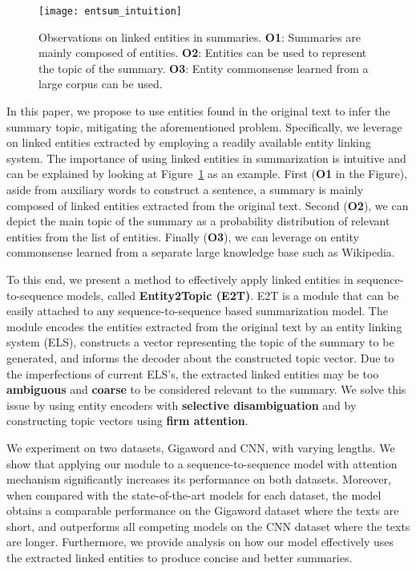 \documentclass[11pt,a4paper]{article}
\begin{document}
\begin{figure}
    \centering
    \texttt{[image: entsum\_intuition]}
    \caption{Observations on linked entities in summaries. \textbf{O1}: Summaries are mainly composed of entities. \textbf{O2}: Entities can be used to represent the topic of the summary. \textbf{O3}: Entity commonsense learned from a large corpus can be used.}
    \label{fig:intuition}
\end{figure}

In this paper, we propose to use entities found in the original text to infer the summary topic, mitigating the aforementioned problem.
Specifically, we leverage on linked entities extracted by employing
a readily available entity linking system.
The importance of using linked entities in summarization is intuitive and can be explained by looking at Figure~\ref{fig:intuition} as an example. First (\textbf{O1} in the Figure), aside from auxiliary words to construct a sentence, a summary is mainly composed of linked entities extracted from the original text. Second (\textbf{O2}), we can depict the main topic of the summary as a probability distribution of relevant entities from the list of entities. Finally (\textbf{O3}), we can leverage on entity commonsense learned from a separate large knowledge base such as Wikipedia.

To this end, we present a method to effectively apply linked entities in sequence-to-sequence models, called \textbf{Entity2Topic (E2T)}. E2T is a module that can be easily attached to any sequence-to-sequence based summarization model. The module encodes the entities extracted from the original text by an entity linking system (ELS), constructs a vector representing the topic of the summary to be generated, and informs the decoder about the constructed topic vector. Due to the imperfections of current ELS's, the extracted linked entities may be too \textbf{ambiguous} and \textbf{coarse} to be considered relevant to the summary. We solve this issue by using entity encoders with \textbf{selective disambiguation} and by constructing topic vectors using \textbf{firm attention}.

We experiment on two datasets, Gigaword and CNN, with varying lengths. We show that applying our module to a sequence-to-sequence model with attention mechanism significantly increases its performance on both datasets.
Moreover, when compared with the state-of-the-art models for each dataset, the model obtains a comparable performance on the Gigaword dataset where the texts are short, and outperforms all competing models on the CNN dataset where the texts are longer.
Furthermore, we provide analysis on how our model effectively uses the extracted linked entities to produce concise and better summaries.
\end{document}
